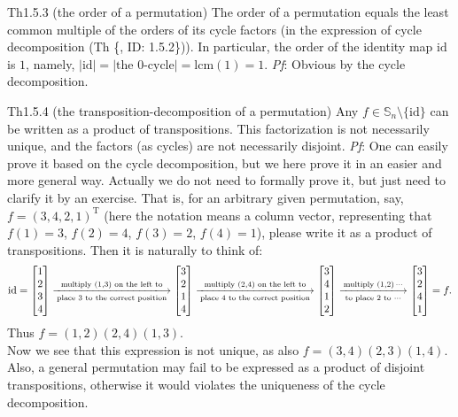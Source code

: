 \documentclass{article}
\newcommand{\lcm}{\text{lcm}}
\begin{document}
\begin{Th}{Th1.5.3 (the order of a permutation)}
    The order of a permutation equals the least common multiple of the orders of its cycle factors (in the expression of cycle decomposition (Th \{, ID: 1.5.2\})). In particular, the order of the identity map $\mathrm{id}$ is $1$, namely, $|\mathrm{id}|=|\text{the } 0\text{-cycle}| = \lcm(1) = 1$.
    \tcblower
    \textit{Pf}: Obvious by the cycle decomposition.
\end{Th}

\begin{Th}{Th1.5.4 (the transposition-decomposition of a permutation)}
    Any $f\in\mathbb{S}_n\setminus\{\mathrm{id}\}$ can be written as a product of transpositions. This factorization is not necessarily unique, and the factors (as cycles) are not necessarily disjoint.
    \tcblower
    \textit{Pf}: One can easily prove it based on the cycle decomposition, but we here prove it in an easier and more general way. Actually we do not need to formally prove it, but just need to clarify it by an exercise. That is, for an arbitrary given permutation, say, $f = (3, 4, 2, 1)^\mathrm{T}$ (here the notation means a column vector, representing that $f(1) = 3$, $f(2) = 4$, $f(3) = 2$, $f(4) = 1$), please write it as a product of transpositions. Then it is naturally to think of:
    $$ \mathrm{id} = \begin{bmatrix}
        1 \\ 2 \\ 3 \\ 4
    \end{bmatrix} \xlongrightarrow[\text{place } 3\text{ to the correct position}]{\text{multiply }(1,3) \text{ on the left to}} \begin{bmatrix}
        3 \\ 2 \\ 1 \\ 4
    \end{bmatrix} \xlongrightarrow[\text{place } 4\text{ to the correct position}]{\text{multiply }(2,4) \text{ on the left to}} \begin{bmatrix}
        3 \\ 4 \\ 1 \\ 2
    \end{bmatrix} \xlongrightarrow[\text{to place } 2\text{ to }\cdots]{\text{multiply }(1,2)\, \cdots} \begin{bmatrix}
        3 \\ 2 \\ 4 \\ 1
    \end{bmatrix} = f. $$
    Thus $f = (1,2)(2,4)(1,3)$. \\
    Now we see that this expression is not unique, as also $f = (3,4)(2,3)(1,4)$. Also, a general permutation may fail to be expressed as a product of disjoint transpositions, otherwise it would violates the uniqueness of the cycle decomposition. 
\end{Th}
\end{document}
